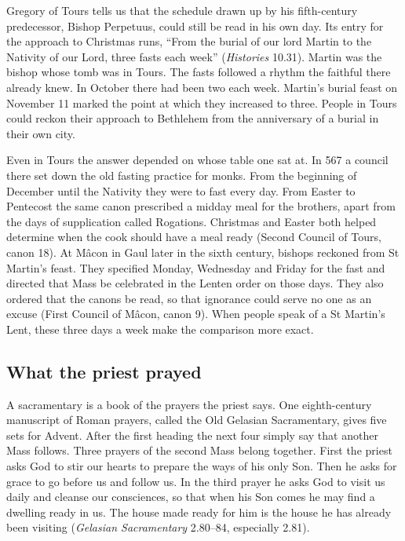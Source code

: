 Gregory of Tours tells us that the schedule drawn up by his fifth-century
predecessor, Bishop Perpetuus, could still be read in his own day. Its entry
for the approach to Christmas runs, “From the burial of our lord Martin to the
Nativity of our Lord, three fasts each week” (\emph{Histories} 10.31). Martin
was the bishop whose tomb was in Tours. The fasts followed a rhythm the
faithful there already knew. In October there had been two each week.
Martin's burial feast on November 11 marked the point at which they
increased to three. People in Tours could reckon their approach to
Bethlehem from the anniversary of a burial in their own city.

Even in Tours the answer depended on whose table one sat at. In 567 a
council there set down the old fasting practice for monks. From the
beginning of December until the Nativity they were to fast every day.
From Easter to Pentecost the same canon prescribed a midday meal for
the brothers, apart from the days of supplication called Rogations.
Christmas and Easter both helped
determine when the cook should have a meal ready
(Second Council of Tours, canon 18). At Mâcon in Gaul later in the
sixth century, bishops reckoned from St Martin's feast. They specified
Monday, Wednesday and Friday for the fast and directed that Mass be
celebrated in the Lenten order on those days. They also ordered that
the canons be read, so that ignorance could serve no one as an excuse
(First Council of Mâcon, canon 9). When people speak of a St Martin's
Lent, these three days a week make the comparison more exact.

\subsection{What the priest prayed}

A sacramentary is a book of the prayers the priest says. One eighth-century
manuscript of Roman prayers, called the Old Gelasian Sacramentary, gives five
sets for Advent. After the first heading the next four simply say that
another Mass follows. Three prayers of the second Mass belong together. First the priest asks
God to stir our hearts to prepare the ways of his only Son. Then he asks
for grace to go before us and follow us. In the third prayer he asks
God to visit us daily and cleanse our consciences, so that
when his Son comes he may find a dwelling ready in us. The house made
ready for him is the house he has already been visiting
(\emph{Gelasian Sacramentary} 2.80--84, especially 2.81).

